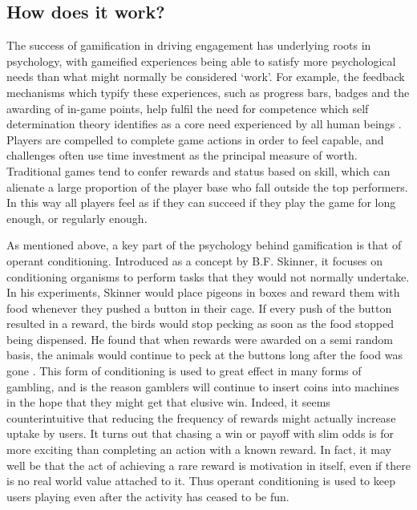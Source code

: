 \documentclass[12pt]{article}
\begin{document}
\subsection{How does it work?}
The success of gamification in driving engagement has underlying roots in psychology, with gameified experiences being able to satisfy more psychological needs than what might normally be considered `work'. For example, the feedback mechanisms which typify these experiences, such as progress bars, badges and the awarding of in-game points, help fulfil the need for competence which self determination theory identifies as a core need experienced by all human beings \cite{przybylski2010motivational}. Players are compelled to complete game actions in order to feel capable, and challenges often use time investment as the principal measure of worth. Traditional games tend to confer rewards and status based on skill, which can alienate a large proportion of the player base who fall outside the top performers. In this way all players feel as if they can succeed if they play the game for long enough, or regularly enough.

As mentioned above, a key part of the psychology behind gamification is that of operant conditioning. Introduced as a concept by B.F. Skinner, it focuses on conditioning organisms to perform tasks that they would not normally undertake. In his experiments, Skinner would place pigeons in boxes and reward them with food whenever they pushed a button in their cage. If every push of the button resulted in a reward, the birds would stop pecking as soon as the food stopped being dispensed. He found that when rewards were awarded on a semi random basis, the animals would continue to peck at the buttons long after the food was gone \cite{kapp2012gamification}. This form of conditioning is used to great effect in many forms of gambling, and is the reason gamblers will continue to insert coins into machines in the hope that they might get that elusive win. Indeed, it seems counterintuitive that reducing the frequency of rewards might actually increase uptake by users. It turns out that chasing a win or payoff with slim odds is for more exciting than completing an action with a known reward. In fact, it may well be that the act of achieving a rare reward is motivation in itself, even if there is no real world value attached to it. Thus operant conditioning is used to keep users playing even after the activity has ceased to be fun.
\end{document}
